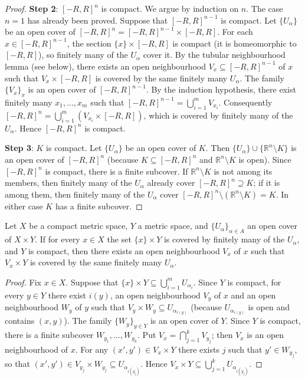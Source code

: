 \begin{proof}
\textbf{Step 2}: $[-R, R]^n$ is compact. We argue by induction on $n$. The case $n = 1$ has already been proved. Suppose that $[-R, R]^{n-1}$ is compact. Let $\{U_\alpha\}$ be an open cover of $[-R, R]^n = [-R, R]^{n-1} \times [-R, R]$. For each $x \in [-R, R]^{n-1}$, the section $\{x\} \times [-R, R]$ is compact (it is homeomorphic to $[-R, R]$), so finitely many of the $U_\alpha$ cover it. By the tubular neighbourhood lemma (see below), there exists an open neighbourhood $V_x \subseteq [-R, R]^{n-1}$ of $x$ such that $V_x \times [-R, R]$ is covered by the same finitely many $U_\alpha$. The family $\{V_x\}_{x}$ is an open cover of $[-R, R]^{n-1}$. By the induction hypothesis, there exist finitely many $x_1, \dots, x_m$ such that $[-R, R]^{n-1} = \bigcup_{i=1}^{m} V_{x_i}$. Consequently $[-R, R]^n = \bigcup_{i=1}^{m} (V_{x_i} \times [-R, R])$, which is covered by finitely many of the $U_\alpha$. Hence $[-R, R]^n$ is compact.

\textbf{Step 3}: $K$ is compact. Let $\{U_\alpha\}$ be an open cover of $K$. Then $\{U_\alpha\} \cup \{\mathbb{R}^n \setminus K\}$ is an open cover of $[-R, R]^n$ (because $K \subseteq [-R, R]^n$ and $\mathbb{R}^n \setminus K$ is open). Since $[-R, R]^n$ is compact, there is a finite subcover. If $\mathbb{R}^n \setminus K$ is not among its members, then finitely many of the $U_\alpha$ already cover $[-R, R]^n \supseteq K$; if it is among them, then finitely many of the $U_\alpha$ cover $[-R, R]^n \setminus (\mathbb{R}^n \setminus K) = K$. In either case $K$ has a finite subcover.
\end{proof}

\begin{lemma}\label{lem:tube_neighbourhood}
Let $X$ be a compact metric space, $Y$ a metric space, and $\{U_\alpha\}_{\alpha \in A}$ an open cover of $X \times Y$. If for every $x \in X$ the set $\{x\} \times Y$ is covered by finitely many of the $U_\alpha$, and $Y$ is compact, then there exists an open neighbourhood $V_x$ of $x$ such that $V_x \times Y$ is covered by the same finitely many $U_\alpha$.
\end{lemma}

\begin{proof}
Fix $x \in X$. Suppose that $\{x\} \times Y \subseteq \bigcup_{i=1}^{m} U_{\alpha_i}$. Since $Y$ is compact, for every $y \in Y$ there exist $i(y)$, an open neighbourhood $V_y$ of $x$ and an open neighbourhood $W_y$ of $y$ such that $V_y \times W_y \subseteq U_{\alpha_{i(y)}}$ (because $U_{\alpha_{i(y)}}$ is open and contains $(x, y)$). The family $\{W_y\}_{y \in Y}$ is an open cover of $Y$. Since $Y$ is compact, there is a finite subcover $W_{y_1}, \dots, W_{y_k}$. Put $V_x = \bigcap_{j=1}^{k} V_{y_j}$; then $V_x$ is an open neighbourhood of $x$. For any $(x', y') \in V_x \times Y$ there exists $j$ such that $y' \in W_{y_j}$, so that $(x', y') \in V_{y_j} \times W_{y_j} \subseteq U_{\alpha_{i(y_j)}}$. Hence $V_x \times Y \subseteq \bigcup_{j=1}^{k} U_{\alpha_{i(y_j)}}$.
\end{proof}

